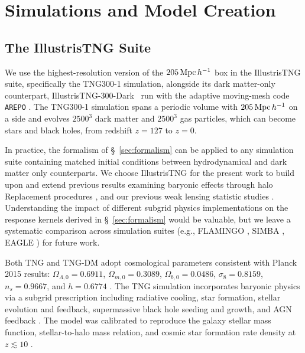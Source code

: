 \documentclass[linenumbers,trackchanges]{aastex701}
\begin{document}
\section{Simulations and Model Creation}
\label{sec:simulations}

\subsection{The IllustrisTNG Suite}

We use the highest-resolution version of the $205\,{\rm Mpc}\,h^{-1}$ box in the IllustrisTNG suite, specifically the TNG300-1 simulation, alongside its dark matter-only counterpart, IllustrisTNG-300-Dark~\citep[][hereafter TNG and TNG-Dark, respectively]{Pillepich17, springel18,Nelson2019,naiman18,Marinacci18} run with the adaptive moving-mesh code \texttt{AREPO} \citep{Volker10}. The TNG300-1 simulation spans a periodic volume with $205\,{\rm Mpc}\,h^{-1}$ on a side and evolves $2500^3$ dark matter and $2500^3$ gas particles, which can become stars and black holes, from redshift $z=127$ to $z=0$.

In practice, the formalism of \S~\ref{sec:formalism} can be applied to any simulation suite containing matched initial conditions between hydrodynamical and dark matter only counterparts. We choose IllustrisTNG for the present work to build upon and extend previous results examining baryonic effects through halo Replacement procedures \citep{Miller-25}, and our previous weak lensing statistic studies \citep{Osato21, leeComparingWeakLensing2022, Lee26}. Understanding the impact of different subgrid physics implementations on the response kernels derived in \S~\ref{sec:formalism} would be valuable, but we leave a systematic comparison across simulation suites (e.g., FLAMINGO \citep{Flamingo-23}, SIMBA \citep{SIMBA}, EAGLE \citep{EAGLE}) for future work.

Both TNG and TNG-DM adopt cosmological parameters consistent with Planck 2015 results: $\Omega_{\Lambda,0}=0.6911$, $\Omega_{m,0}=0.3089$, $\Omega_{b,0}=0.0486$, $\sigma_8=0.8159$, $n_s=0.9667$, and $h=0.6774$ \citep{Ade16}. The TNG simulation incorporates baryonic physics via a subgrid prescription including radiative cooling, star formation, stellar evolution and feedback, supermassive black hole seeding and growth, and AGN feedback \citep{springel18}. The model was calibrated to reproduce the galaxy stellar mass function, stellar-to-halo mass relation, and cosmic star formation rate density at $z\lesssim 10$ \citep{springel18}.
\end{document}
